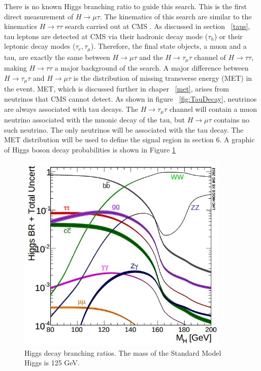 \documentclass[oneside, letterpaper, oldfontcommands]{memoir}
\begin{document}
\qquad There is no known Higgs branching ratio to guide this search. This is the first direct measurement of $H \rightarrow \mu \tau$. The kinematics of this search are similar to the kinematics $H \rightarrow \tau\tau$ search carried out at CMS \cite{Chatrchyan:2012xdj}. As discussed in section ~\ref{taus}, tau leptons are detected at CMS via their hadronic decay mode ($\tau_{h}$) or their leptonic decay modes ($\tau_{e}, \tau_{\mu}$). Therefore, the final state objects, a muon and a tau, are exactly the same between $H \rightarrow \mu \tau$ and the $H \rightarrow \tau_{\mu} \tau$ channel of $H \rightarrow \tau\tau$, making $H \rightarrow \tau\tau$ a major background of the search. A major difference between $H \rightarrow \tau_{\mu} \tau$ and $H \rightarrow \mu \tau$ is the distribution of missing transverse energy (MET) in the event. MET, which is discussed further in chaper ~\ref{met}, arises from neutrinos that CMS cannot detect. As shown in figure ~\ref{fig:TauDecay}, neutrinos are always associated with tau decays. The $H \rightarrow \tau_{\mu} \tau$ channel will contain a muon neutrino associated with the muonic decay of the tau, but $H \rightarrow \mu \tau$ contains no such neutrino. The only neutrinos will be associated with the tau decay. The MET distribution will be used to define the signal region in section 6. A graphic of Higgs boson decay probabilities is shown in Figure \ref{fig:higgsBR}\cite{Heinemeyer:2013tqa}

\begin{figure}[here]
\includegraphics[width=0.9\textwidth]{higgsBR.jpg}
\caption{Higgs decay branching ratios\cite{Heinemeyer:2013tqa}. The mass of the Standard Model Higgs is 125 GeV. }
\label{fig:higgsBR}
\end{figure}
\end{document}
